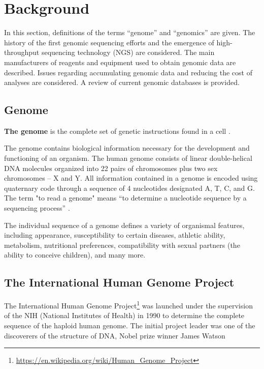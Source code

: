 \section{Background}
\begin{overview}
In this section, definitions of the terms “genome” and “genomics” are given. The history of the first genomic sequencing efforts and the emergence of high-throughput sequencing technology (NGS) are considered. The main manufacturers of reagents and equipment used to obtain genomic data are described. Issues regarding accumulating genomic data and reducing the cost of analyses are considered. A review of current genomic databases is provided.
\end{overview}


\subsection{Genome}
\textbf{The genome} is the complete set of genetic instructions found in a cell \cite{genome.gov:glossary:genome}.

The genome contains biological information necessary for the development and functioning of an organism. The human genome consists of linear double-helical DNA molecules organized into 22 pairs of chromosomes plus two sex chromosomes – X and Y. All information contained in a genome is encoded using quaternary code through a sequence of 4 nucleotides designated A, T, C, and G. The term "to read a genome" means “to determine a nucleotide sequence by a sequencing process” \cite{clinchem:61:9:1207}.

The individual sequence of a genome defines a variety of organismal features, including appearance, susceptibility to certain diseases, athletic ability, metabolism, nutritional preferences, compatibility with sexual partners (the ability to conceive children), and many more.

\subsection{The International Human Genome Project}
The International Human Genome Project\footnote{\url{https://en.wikipedia.org/wiki/Human_Genome_Project}}  was launched under the supervision of the NIH (National Institutes of Health) in 1990 to determine the complete sequence of the haploid human genome. The initial project leader was one of the discoverers of the structure of DNA, Nobel prize winner James Watson

